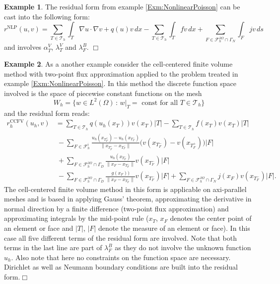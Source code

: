 \documentclass[a4paper,12pt]{article}
\theoremstyle{definition}
\newtheorem{exm}{Example}
\begin{document}
\begin{exm} \label{Exm:NonlinearPoissonDetailedResidualForm}
The residual form from example \ref{Exm:NonlinearPoisson} can be cast into the
following form:
\begin{equation*}
r^{\text{NLP}}(u,v) =
\sum_{T\in\mathcal{T}_h} \int_T \nabla u \cdot \nabla v + q(u)v \,dx
- \sum_{T\in\mathcal{T}_h} \int_T fv \,dx
+ \sum_{F\in\mathcal{F}_h^{\partial\Omega}\cap\Gamma_N} \int_{F} jv\,ds
\end{equation*}
and involves $\alpha_T^V$, $\lambda_T^V$ and $\lambda_F^B$. \hfill$\Box$
\end{exm}

\begin{exm} \label{Exm:FiniteVolumeMethod}
As a another example consider the cell-centered finite volume method with two-point
flux approximation applied to the problem treated in example \ref{Exm:NonlinearPoisson}.
In this method the discrete function space involved is the space of piecewise constant
functions on the mesh
\begin{equation*}
W_h = \{w\in L^2(\Omega) \,:\,  \text{$w|_T=$ const for all $T\in\mathcal{T}_h$}\}
\end{equation*}
and the residual form reads:
\begin{equation*}
\begin{split}
r_h^{\text{CCFV}}(u_h,v)
& = \sum_{T\in\mathcal{T}_h} q(u_h(x_T)) v(x_T) |T|
- \sum_{T\in\mathcal{T}_h} f(x_T) v(x_T) |T|\\
&\ - \sum_{F\in\mathcal{F}_h^i}
\frac{u_h(x_{T_F^+})-u_h(x_{T_F^-})}{\|x_{T_F^+} - x_{T_F^-}\|}
\bigl(v(x_{T_F^-}) - v(x_{T_F^+})\bigr) |F|\\
&\ + \sum_{F\in\mathcal{F}_h^{\partial\Omega}\cap\Gamma_D}
\frac{u_h(x_{T_F^-})}{\|x_{F} - x_{T_F^-}\|} v(x_{T_F^-}) |F| \\
&\ - \sum_{F\in\mathcal{F}_h^{\partial\Omega}\cap\Gamma_D}
\frac{g(x_{F}))}{\|x_{F} - x_{T_F^-}\|} v(x_{T_F^-}) |F|
+ \sum_{F\in\mathcal{F}_h^{\partial\Omega}\cap\Gamma_N} j(x_{F}) v(x_{T_F^-}) |F| .
\end{split}
\end{equation*}
The cell-centered finite volume method in this form is applicable on
axi-parallel meshes and is based in applying Gauss' theorem, approximating
the derivative in normal direction by a finite difference (two-point
flux approximation) and approximating integrals by the mid-point rule
($x_T$, $x_F$ denotes the center point of an element or face and
$|T|$, $|F|$ denote the measure of an element or face).
In this case all five different terms of the residual form are involved.
Note that both terms in the last line are part of $\lambda_F^B$ as
they do not involve the unknown function $u_h$.
Also note that here no constraints on the function space are necessary.
Dirichlet as well as Neumann boundary conditions are built into the
residual form.\hfill$\Box$
\end{exm}
\end{document}
